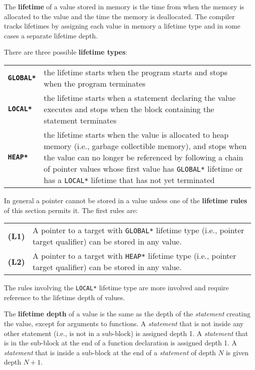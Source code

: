 \documentclass[12pt]{article}
\newcommand{\key}[1]{{\rm \bfseries #1}}
\newcommand{\ttkey}[1]{{\tt \bfseries #1}}
\newcommand{\skey}[2]{{\rm \bfseries #1#2}}
\newenvironment{indpar}[1][0.3in]%
	{\begin{list}{}%
		     {\setlength{\itemsep}{0in}%
		      \setlength{\topsep}{0in}%
		      \setlength{\parsep}{1ex}%
		      \setlength{\labelwidth}{#1}%
		      \setlength{\leftmargin}{#1}%
		      \addtolength{\leftmargin}{\labelsep}}%
	 \item}%
	{\end{list}}
\begin{document}
The \key{lifetime} of a value stored in memory is the time from
when the memory is allocated to the value and the time the memory
is deallocated.  The compiler tracks lifetimes by assigning each
value in memory a lifetime type and in some cases a separate lifetime depth.

There are three possible \skey{lifetime type}s:
\begin{indpar}[0.2in]
\begin{tabular}{lp{5.0in}}
\ttkey{*GLOBAL*}	& the lifetime starts when the program
                          starts and stops when the program terminates
\\[1ex]
\ttkey{*LOCAL*}		& the lifetime starts when a statement declaring
                          the value executes and stops when the block
			  containing the statement terminates
\\[1ex]
\ttkey{*HEAP*}		& the lifetime starts when the value is allocated
                          to heap memory (i.e., garbage collectible
			  memory), and stops when the value can no longer
			  be referenced by following a chain of pointer values
			  whose first value has {\tt *GLOBAL*} lifetime
			  or has a {\tt *LOCAL*} lifetime that has not
			  yet terminated
\end{tabular}
\end{indpar}

In general a pointer cannot be stored in a value unless one of the
\skey{lifetime rule}s of this section permits it.  The first rules are:
\begin{indpar}[0.2in]
\begin{tabular}{lp{5.0in}}
\key{(L1)}	& A pointer to a target with {\tt *GLOBAL*} lifetime type
                  (i.e., pointer target qualifier) can be stored in any value.
\\[1ex]
\key{(L2)}	& A pointer to a target with {\tt *HEAP*} lifetime type
                  (i.e., pointer target qualifier) can be stored in any value.
\end{tabular}
\end{indpar}

The rules involving the {\tt *LOCAL*} lifetime type are more involved and
require reference to the lifetime depth of values.

The \key{lifetime depth} of a value is the same as the depth
of the {\em statement} creating the value, except for arguments
to functions.  A {\em statement} that is not inside any other statement
(i.e., is not in a sub-block) is assigned depth 1.
A {\em statement} that is in the sub-block at the end of a function
declaration is assigned depth 1.
A {\em statement} that is inside a sub-block
at the end of a {\em statement} of depth $N$ is given depth $N+1$.
\end{document}
